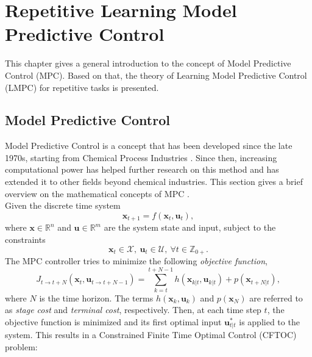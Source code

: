 \chapter{Repetitive Learning Model Predictive Control}
This chapter gives a general introduction to the concept of Model Predictive Control (MPC). Based on that, the theory of Learning Model Predictive Control (LMPC) for repetitive tasks is presented. %

\section{Model Predictive Control}
Model Predictive Control is a concept that has been developed since the late 1970s, starting from Chemical Process Industries \cite{garcia1989model}. Since then, increasing computational power  has helped further research on this method and has extended it to other fields beyond chemical industries.
This section gives a brief overview on the mathematical concepts of MPC \cite{Borrelli2003}.\\
Given the discrete time system
\begin{equation}\label{eq:systemDynamics}
\bm{x}_{t+1}=f(\bm{x}_t,\bm{u}_t),
\end{equation}
where $\bm{x}\in \mathbb{R}^n$ and $\bm{u}\in\mathbb{R}^m$ are the system state and input, subject to the constraints
\begin{equation}
\bm{x}_t\in\mathcal{X},\ \bm{u}_t\in\mathcal{U},\ \forall t\in\mathbb{Z}_{0+}.
\end{equation}
The MPC controller tries to minimize the following \emph{objective function},
\begin{equation}
J_{t\rightarrow t+N}(\bm{x}_t,\bm{u}_{t\rightarrow t+N-1})=\sum_{k=t}^{t+N-1}h(\bm{x}_{k|t},\bm{u}_{k|t}) + p(\bm{x}_{t+N|t}),
\end{equation}
where $N$ is the time horizon. The terms $h(\bm{x}_k,\bm{u}_k)$ and $p(\bm{x}_N)$ are referred to as \emph{stage cost} and \emph{terminal cost}, respectively. 
Then, at each time step $t$, the objective function is minimized and its first optimal input $\bm{u}_{t|t}^*$ is applied to the system. This results in a Constrained Finite Time Optimal Control (CFTOC) problem:

